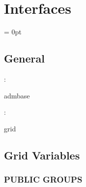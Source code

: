 
\section{Interfaces} 


\parskip = 0pt

\vspace{3mm} \subsection*{General}

: 

admbase
\vspace{2mm}

: 

grid
\vspace{2mm}
\subsection*{Grid Variables}
\vspace{5mm}\subsubsection{PUBLIC GROUPS}

\vspace{5mm}


